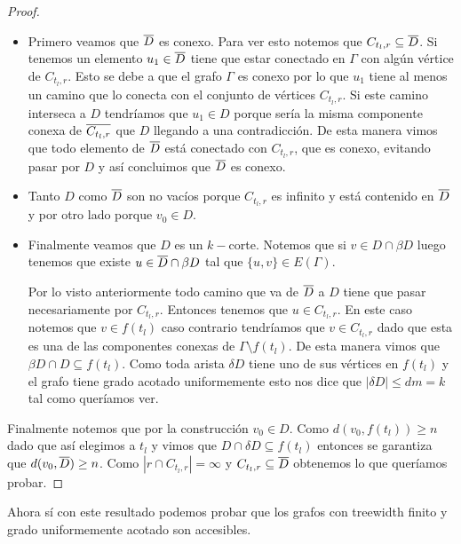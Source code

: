\documentclass[tesis.tex]{subfiles}
\begin{document}
\begin{proof}
	\begin{itemize}
		\item 	
		Primero veamos que $\overline D$ es conexo.
		Para ver esto notemos que $C_{t_{l},r} \subseteq \overline D$. 
		Si tenemos un elemento $u_1 \in \overline D$ tiene que estar conectado en $\Gamma$ con algún vértice de $C_{t_l, r}$.
		Esto se debe a que el grafo $\Gamma$ es conexo por lo que $u_{1}$ tiene al menos un camino que lo conecta con el conjunto de vértices $C_{t_{l},r}$.
		Si este camino interseca a $D$ tendríamos que $u_{1} \in D$ porque sería la misma componente conexa de $\overline{ C_{t_l, r}}$ que $D$ llegando a una contradicción.
		De esta manera vimos que todo elemento de $\overline D$ está conectado con  $C_{t_l, r}$, que es conexo, evitando pasar por $D$ y así concluimos que $\overline D$ es conexo.
		\item 
		Tanto $D$ como $\overline D$ son no vacíos porque $C_{t_l, r}$ es infinito y está contenido en $\overline D$ y por otro lado porque $v_0 \in D$.
		\item
		Finalmente veamos que $D$ es un $k-$corte.
		Notemos que si $v \in D \cap \beta D$ luego tenemos que existe $u \in \overline D \cap \beta D$ tal que $\{u,v\} \in E(\Gamma)$.
		
		Por lo visto anteriormente todo camino que va de $\overline D$ a $D$ tiene que pasar necesariamente por $C_{t_l, r}$. 
		Entonces tenemos que $u \in C_{t_l, r}$.
		En este caso notemos que $v \in f{(t_l)}$ caso contrario tendríamos que $v \in C_{t_l, r}$ dado que esta es una de las componentes conexas de $\Gamma \setminus f{(t_l)}$.
		De esta manera vimos que $\beta D \cap D \subseteq f{(t_l)}$.
		Como toda arista $\delta D$ tiene uno de sus vértices en $f(t_{l})$ y el grafo tiene grado acotado uniformemente esto nos dice que $|\delta D| \le dm = k$ tal como queríamos ver. 
		
	\end{itemize}
	
Finalmente notemos que por la construcción $v_{0} \in D$.
Como $d(v_{0}, f(t_{l})) \ge n$ dado que así elegimos a $t_{l}$ 
y vimos que $D \cap \delta D \subseteq f(t_{l})$
entonces se garantiza que $d(v_{0}, \overline D) \ge n$. 
Como $|r \cap C_{t_{l},r}| = \infty$ y $C_{t_{l},r} \subseteq \overline D$ obtenemos lo que queríamos probar.
	
\end{proof}

Ahora sí con este resultado podemos probar que los grafos con treewidth finito y grado uniformemente acotado son accesibles.
\end{document}
